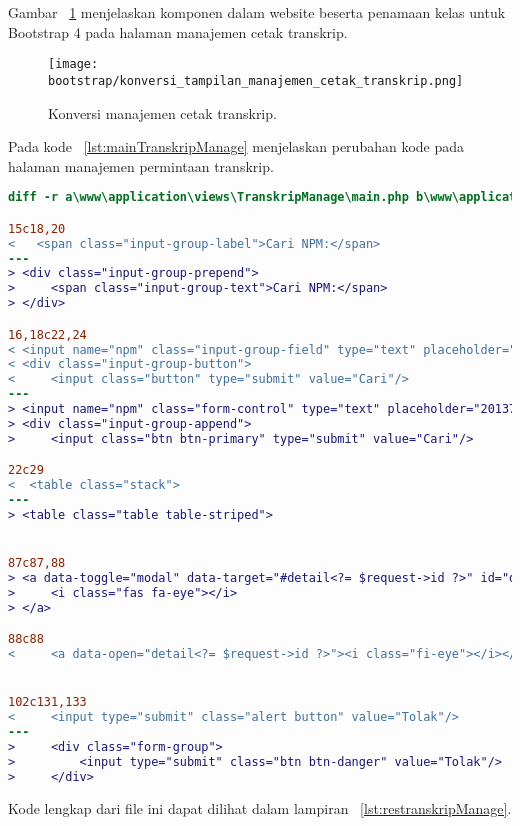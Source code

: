 \noindent Gambar ~\ref{fig:konversiManajemenCetakTranskrip} menjelaskan komponen dalam website beserta penamaan kelas untuk Bootstrap 4 pada halaman manajemen cetak transkrip.\\
\begin{figure} [H]
	\centering  
	\texttt{[image: bootstrap/konversi\_tampilan\_manajemen\_cetak\_transkrip.png]}
	\caption{Konversi manajemen cetak transkrip.} 
	\label{fig:konversiManajemenCetakTranskrip}
\end{figure}

Pada kode ~\ref{lst:mainTranskripManage} menjelaskan perubahan kode pada halaman manajemen permintaan transkrip.

\begin{lstlisting}[language=diff, caption=Perubahan file \path{\views\TranskripManage\main.php},  basicstyle=\ttfamily, frame=single,
columns=fullflexible, keepspaces=true, breaklines=true, label={lst:mainTranskripManage}]
diff -r a\www\application\views\TranskripManage\main.php b\www\application\views\TranskripManage\main.php

15c18,20
< 	<span class="input-group-label">Cari NPM:</span>
---
> <div class="input-group-prepend">
>     <span class="input-group-text">Cari NPM:</span>
> </div>

16,18c22,24
< <input name="npm" class="input-group-field" type="text" placeholder="2013730013" maxlength="10" minlength="10"<?= $npmQuery === NULL ? '' : " value='$npmQuery'" ?>/>
< <div class="input-group-button">
<     <input class="button" type="submit" value="Cari"/>
---
> <input name="npm" class="form-control" type="text" placeholder="2013730013" maxlength="10" minlength="10"<?= $npmQuery === NULL ? '' : " value='$npmQuery'" ?>/>
> <div class="input-group-append">
>     <input class="btn btn-primary" type="submit" value="Cari"/>

22c29
<  <table class="stack">
---
> <table class="table table-striped">


87c87,88
> <a data-toggle="modal" data-target="#detail<?= $request->id ?>" id="detailIkon<?= $request->id ?>">
>     <i class="fas fa-eye"></i>
> </a>

88c88
<     <a data-open="detail<?= $request->id ?>"><i class="fi-eye"></i></a>


102c131,133
<     <input type="submit" class="alert button" value="Tolak"/>
---
>     <div class="form-group">
>         <input type="submit" class="btn btn-danger" value="Tolak"/>
>     </div>

\end{lstlisting}
Kode lengkap dari file ini dapat dilihat dalam lampiran ~\ref{lst:restranskripManage}.

